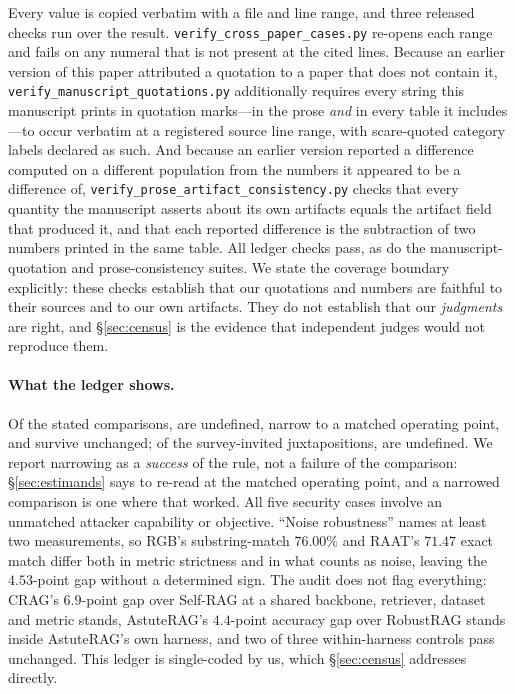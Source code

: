 \documentclass[11pt]{article}
\begin{document}
Every value is copied verbatim with a file and line range, and three released
checks run over the result. \texttt{verify\_cross\_paper\_cases.py} re-opens
each range and fails on any numeral that is not present at the cited lines.
Because an earlier version of this paper attributed a quotation to a paper that
does not contain it, \texttt{verify\_manuscript\_quotations.py} additionally
requires every string this manuscript prints in quotation marks---in the prose
\emph{and} in every table it includes---to occur verbatim at a registered
source line range, with scare-quoted category labels declared as such. And
because an earlier version reported a difference computed on a different
population from the numbers it appeared to be a difference of,
\texttt{verify\_prose\_artifact\_consistency.py} checks that every quantity the
manuscript asserts about its own artifacts equals the artifact field that
produced it, and that each reported difference is the subtraction of two
numbers printed in the same table. All \VerifChecks{} ledger checks pass, as do
the manuscript-quotation and prose-consistency suites. We state the coverage
boundary explicitly: these checks establish that our quotations and numbers are
faithful to their sources and to our own artifacts. They do not establish that
our \emph{judgments} are right, and \S\ref{sec:census} is the evidence that
independent judges would not reproduce them.

\paragraph{What the ledger shows.}
Of the \LedgerStated{} stated comparisons, \LedgerStatedUndef{} are undefined,
\LedgerStatedNarrow{} narrow to a matched operating point, and
\LedgerStatedSurv{} survive unchanged; of the \LedgerInvited{} survey-invited
juxtapositions, \LedgerInvitedUndef{} are undefined. We report narrowing as a
\emph{success} of the rule, not a failure of the comparison: \S\ref{sec:estimands}
says to re-read at the matched operating point, and a narrowed comparison is one
where that worked. All five security cases involve an unmatched attacker
capability or objective. ``Noise robustness'' names at least two measurements,
so RGB's substring-match $76.00\%$ and RAAT's $71.47$ exact match differ both in
metric strictness and in what counts as noise, leaving the $4.53$-point gap
without a determined sign. The audit does not flag everything: CRAG's
$6.9$-point gap over Self-RAG at a shared backbone, retriever, dataset and
metric stands, AstuteRAG's $4.4$-point accuracy gap over RobustRAG stands inside
AstuteRAG's own harness, and two of three within-harness controls pass
unchanged. This ledger is single-coded by us, which \S\ref{sec:census} addresses
directly.
\end{document}
